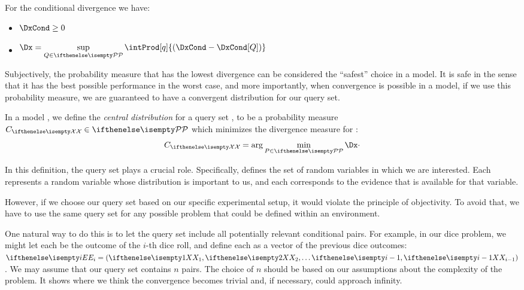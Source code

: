 \begin{proposition}
    For the conditional divergence we have:
    \begin{itemize}
        \item $\begin{aligned}
                   \DxCond \geq 0
        \end{aligned}$
        \item $\begin{aligned}
                   \Dx = \supQ \intProd[q]{\left(\DxCond - \DxCond[Q] \right)}
        \end{aligned}$
    \end{itemize}
\end{proposition}

Subjectively, the probability measure that has the lowest divergence can be considered the ``safest'' choice
in a model.
It is safe in the sense that it has the best possible performance in the worst case, and more importantly, when
convergence is possible in a model, if we use this probability measure, we are guaranteed to
have a convergent distribution for our query set.

\begin{definition}
    In a model \model, we define the \emph{central distribution} for a query set \Qset, to be a probability
    measure $\central \in \set{P}$ which minimizes the divergence measure for \Qset:
    \begin{equation*}
        \central = \arg\minP \Dx\cdot
        \label{eq:center}
    \end{equation*}
\end{definition}

In this definition, the query set \Xpairs plays a crucial role.
Specifically, \Qset defines the set of random variables in which we are interested.
Each \X[i] represents a random variable whose distribution is important to us, and each \E[i] corresponds to the
evidence that is available for that variable.

However, if we choose our query set based on our specific experimental setup, it would violate the
principle of objectivity.
To avoid that, we have to use the same query set for any possible problem that could be
defined within an environment.

One natural way to do this is to let the query set include all potentially relevant conditional pairs.
For example, in our dice problem, we might let each \X[i] be the outcome of the $i$-th dice roll, and define each \E[i]
as a vector of the previous dice outcomes: $\E[i] = (\seqRv{i-1})$.
We may assume that our query set contains $n$ pairs.
The choice of $n$ should be based on our assumptions about the complexity of the problem.
It shows where we think the convergence becomes trivial and, if necessary, could approach infinity.

